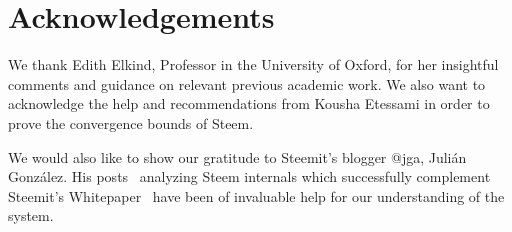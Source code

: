 \section{Acknowledgements}
  We thank Edith Elkind, Professor in the University of Oxford, for her insightful comments and guidance on relevant previous academic work. 
  We also want to acknowledge the help and recommendations from Kousha Etessami in order to prove the convergence bounds of Steem.

  
  We would also like to show our gratitude to Steemit's blogger @jga, Juli\'an Gonz\'alez. His posts~\cite{curationRewards,selfvoters} analyzing Steem internals which successfully complement Steemit's Whitepaper~\cite{steemit} have been of invaluable help for our understanding of the system. 
